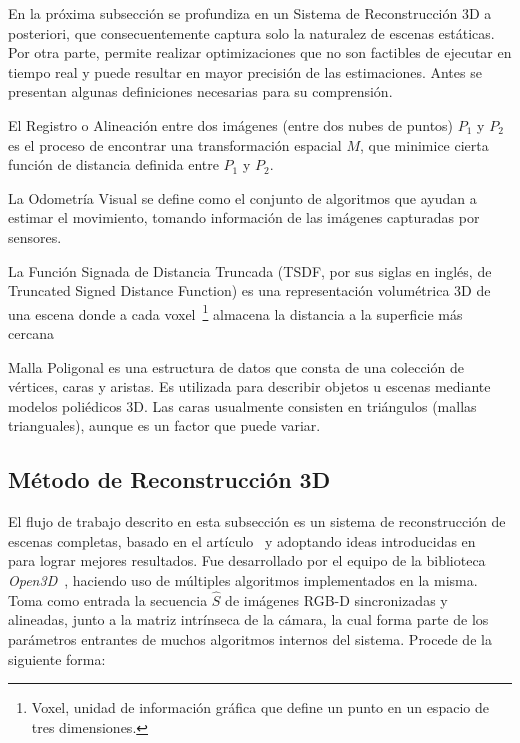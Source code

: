 En la próxima subsección se profundiza en un Sistema de Reconstrucción 3D a posteriori, que consecuentemente captura solo la naturalez de escenas estáticas. Por otra parte, permite realizar optimizaciones que no son factibles de ejecutar en tiempo real y puede resultar en mayor precisión de las estimaciones. Antes se presentan algunas definiciones necesarias para su comprensión.

\begin{definition}
	El Registro o Alineación entre dos imágenes (entre dos nubes de puntos) $P_1$ y $P_2$ es el proceso de encontrar una transformación espacial $M$, que minimice cierta función de distancia definida entre $P_1$ y $P_2$.
\end{definition}

\begin{definition}
	La Odometría Visual se define como el conjunto de algoritmos que ayudan a estimar el movimiento, tomando información de las imágenes capturadas por sensores.
\end{definition}

\begin{definition}
	La Función Signada de Distancia Truncada (TSDF, por sus siglas en inglés, de Truncated Signed Distance Function) es una representación volumétrica 3D de una escena donde a cada voxel~\footnote{Voxel, unidad de información gráfica que define un punto en un espacio de tres dimensiones.} almacena la distancia a la superficie más cercana~\cite{curless1996volumetric}
\end{definition}


\begin{definition}
	Malla Poligonal es una estructura de datos que consta de una colección de vértices, caras y aristas. Es utilizada para describir objetos u escenas mediante modelos poliédicos 3D. Las caras usualmente consisten en triángulos (mallas trianguales), aunque es un factor que puede variar.
\end{definition}


\subsection{Método de Reconstrucción 3D}

El flujo de trabajo descrito en esta subsección es un sistema de reconstrucción de escenas completas, basado en el artículo~\cite{choi2015robust} y adoptando ideas introducidas en~\cite{park2017colored} para lograr mejores resultados. Fue desarrollado por el equipo de la biblioteca \textit{Open3D}~\cite{zhou2018open3d}, haciendo uso de múltiples algoritmos implementados en la misma. Toma como entrada la secuencia $\hat{S}$ de imágenes RGB-D sincronizadas y alineadas, junto a la matriz intrínseca de la cámara, la cual forma parte de los parámetros entrantes de muchos algoritmos internos del sistema. Procede de la siguiente forma:

